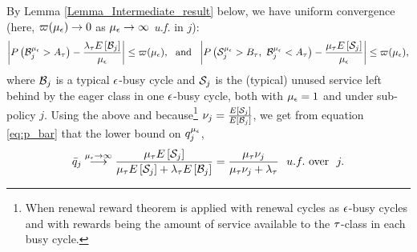 By Lemma \ref{Lemma_Intermediate_result} below, we have uniform
convergence (here, $\varpi(\mue) \to 0$ as $\mue \to \infty$
\textit{u.f.} in $j$):
%  
%   
\begin{eqnarray*}
 \left|\prob{\B^{\mue}_j > A_\t} - \frac{\lambda_\t
  \Exp{\B_j}}{\mue} \right| \leq \varpi(\mue), \ \ \mbox{and} \ \  \left|\prob{\S^{\mue}_j > B_\t,\ \B^{\mue}_j < A_\t} -
  \frac{\mu_\t \Exp{\S_j}}{\mue} \right| \leq \varpi(\mue),
\end{eqnarray*} 
where $\B_j$ is a typical $\i$-busy cycle and $\S_j$ is the (typical)
unused service left behind by the eager class in one $\i$-busy cycle,
both with $\mue = 1$ and under sub-policy $j$.
Using the above and because\footnote{When renewal reward theorem is
  applied with renewal cycles as $\i$-busy cycles and with rewards
  being the amount of service available to the $\t$-class in each busy
  cycle. }  $\nu_j = \frac{\Exp{\S_j}}{\Exp{\B_j}}$, we get from
equation \eqref{eq:p_bar} that the lower bound on $q_j^\mue$,
%
\begin{eqnarray*}
\bar{q}_j \stackrel{\mue \to \infty}{\longrightarrow} \frac{\mu_\t \Exp{\S_j}}{\mu_\t \Exp{\S_j} + \lambda_\t
	\Exp{\B_j} } = \frac{\mut \nu_j}{\mut \nu_j + \lambda_\t} \ \ u.f. \mbox{ over} \ \ j.
\end{eqnarray*}

